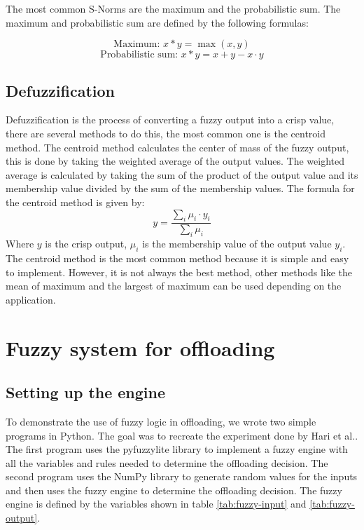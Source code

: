 The most common S-Norms are the maximum and the probabilistic sum. The maximum and probabilistic sum are defined by the following formulas:

\begin{minipage}{0.9685\textwidth}
	\begin{equation}
		\text{Maximum: } x * y = \max(x, y)
	\end{equation}
	\begin{equation}
		\text{Probabilistic sum: } x * y = x + y - x \cdot y
	\end{equation}
\end{minipage}

\subsection{Defuzzification}

Defuzzification is the process of converting a fuzzy output into a crisp value, there are several methods to do this, the most common one is the
centroid method. The centroid method calculates the center of mass of the fuzzy output, this is done by taking the weighted average of the output
values. The weighted average is calculated by taking the sum of the product of the output value and its membership value divided by the sum of the
membership values. The formula for the centroid method is given by:
\begin{equation}
	y = \frac{\sum_{i} \mu_i \cdot y_i}{\sum_{i} \mu_i}
\end{equation}
Where $y$ is the crisp output, $\mu_i$ is the membership value of the output value $y_i$. The centroid method is the most common method because it
is simple and easy to implement. However, it is not always the best method, other methods like the mean of maximum and the largest of maximum can
be used depending on the application.

\section{Fuzzy system for offloading}

\subsection{Setting up the engine}

To demonstrate the use of fuzzy logic in offloading, we wrote two simple programs in Python. The goal was to recreate the experiment done by Hari et
al.\cite{Hari-et-al-2018}. The first program uses the pyfuzzylite\cite{fuzzylite} library to implement a fuzzy engine with all the variables and
rules needed to determine the offloading decision. The second program uses the NumPy library to generate random values for the inputs and then uses
the fuzzy engine to determine the offloading decision. The fuzzy engine is defined by the variables shown in table \ref{tab:fuzzy-input} and
\ref{tab:fuzzy-output}.

